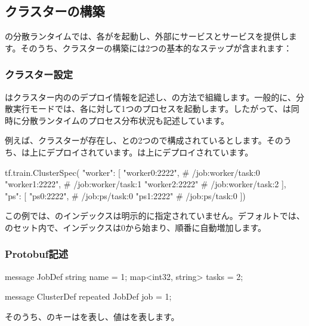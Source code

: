 \begin{content}
\subsection{クラスターの構築}

\tf{}の分散ランタイムでは、各がを起動し、外部にサービスとサービスを提供します。そのうち、クラスターの構築には2つの基本的なステップが含まれます：

\begin{enum}
\end{enum}

\subsubsection{クラスター設定}

はクラスター内ののデプロイ情報を記述し、の方法で組織します。一般的に、分散実行モードでは、各に対して1つのプロセスを起動します。したがって、は同時に\tf{}分散ランタイムのプロセス分布状況も記述しています。

例えば、クラスターが存在し、との2つので構成されているとします。そのうち、は上にデプロイされています。は上にデプロイされています。

\begin{leftbar}
\begin{python}
tf.train.ClusterSpec({
  "worker": [
    "worker0:2222",   # /job:worker/task:0
    "worker1:2222",   # /job:worker/task:1
    "worker2:2222"    # /job:worker/task:2
  ],  
  "ps": [
    "ps0:2222",       # /job:ps/task:0
    "ps1:2222"        # /job:ps/task:0
  ]})
\end{python}
\end{leftbar}

この例では、のインデックスは明示的に指定されていません。デフォルトでは、のセット内で、インデックスは0から始まり、順番に自動増加します。

\subsubsection{Protobuf記述}

\begin{leftbar}
\begin{python}
message JobDef {
  string name = 1;
  map<int32, string> tasks = 2;
}

message ClusterDef {
  repeated JobDef job = 1;
}
\end{python}
\end{leftbar}

そのうち、のキーはを表し、値はを表します。

\end{content}

